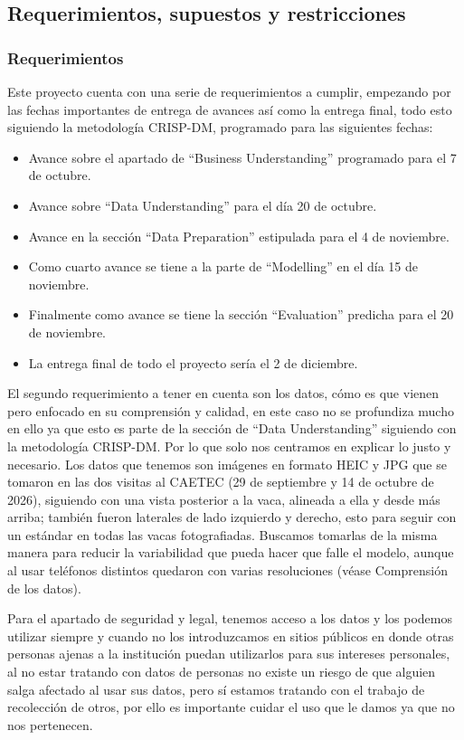 \subsection{Requerimientos, supuestos y restricciones}

\subsubsection{Requerimientos}

Este proyecto cuenta con una serie de requerimientos a cumplir, empezando por las fechas importantes de entrega de avances así como la entrega final, todo esto siguiendo la metodología CRISP-DM, programado para las siguientes fechas:

\begin{itemize}
  \item Avance sobre el apartado de ``Business Understanding'' programado para el 7 de octubre.
  \item Avance sobre ``Data Understanding'' para el día 20 de octubre.
  \item Avance en la sección ``Data Preparation'' estipulada para el 4 de noviembre.
  \item Como cuarto avance se tiene a la parte de ``Modelling'' en el día 15 de noviembre.
  \item Finalmente como avance se tiene la sección ``Evaluation'' predicha para el 20 de noviembre.
  \item La entrega final de todo el proyecto sería el 2 de diciembre.
\end{itemize}

El segundo requerimiento a tener en cuenta son los datos, cómo es que vienen pero enfocado en su comprensión y calidad, en este caso no se profundiza mucho en ello ya que esto es parte de la sección de ``Data Understanding'' siguiendo con la metodología CRISP-DM. Por lo que solo nos centramos en explicar lo justo y necesario. Los datos que tenemos son imágenes en formato HEIC y JPG que se tomaron en las dos visitas al CAETEC (29 de septiembre y 14 de octubre de 2026), siguiendo con una vista posterior a la vaca, alineada a ella y desde más arriba; también fueron laterales de lado izquierdo y derecho, esto para seguir con un estándar en todas las vacas fotografiadas. Buscamos tomarlas de la misma manera para reducir la variabilidad que pueda hacer que falle el modelo, aunque al usar teléfonos distintos quedaron con varias resoluciones (véase Comprensión de los datos).

Para el apartado de seguridad y legal, tenemos acceso a los datos y los podemos utilizar siempre y cuando no los introduzcamos en sitios públicos en donde otras personas ajenas a la institución puedan utilizarlos para sus intereses personales, al no estar tratando con datos de personas no existe un riesgo de que alguien salga afectado al usar sus datos, pero sí estamos tratando con el trabajo de recolección de otros, por ello es importante cuidar el uso que le damos ya que no nos pertenecen.

